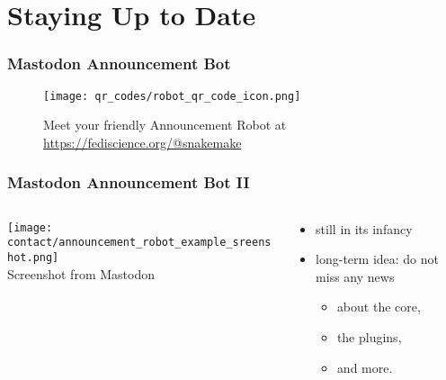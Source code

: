 \section{Staying Up to Date}
{   
}

\begin{frame}
	\frametitle{Mastodon Announcement Bot}
	\centering
	\begin{figure}
		\texttt{[image: qr\_codes/robot\_qr\_code\_icon.png]}\\
		\caption*{Meet your friendly \Snakemake Announcement Robot at \url{https://fediscience.org/@snakemake}}
	\end{figure}
\end{frame}

\begin{frame}
	\frametitle{Mastodon Announcement Bot II}
	\begin{columns}
		\begin{column}{0.5\textwidth}
			\texttt{[image: contact/announcement\_robot\_example\_sreenshot.png]}\\
			Screenshot from Mastodon
		\end{column}
	    \begin{column}{0.5\textwidth}
            \begin{itemize}
            	\item still in its infancy
            	\item long-term idea: do not miss any news
            	\begin{itemize}
            		\item about the \Snakemake core,
            		\item the plugins,
            		\item and more.
            	\end{itemize}
            \end{itemize}
	    \end{column}
	\end{columns}
\end{frame}

